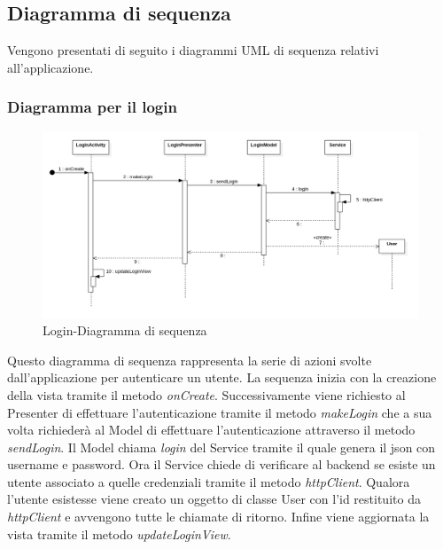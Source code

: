\subsection{Diagramma di sequenza}
Vengono presentati di seguito i diagrammi UML di sequenza relativi all'applicazione.

\subsubsection{Diagramma per il login}
\begin{figure}[H]
	\centering
	\includegraphics[width=16cm]{res/images/loginSeq.png}
	\caption{Login-Diagramma di sequenza}
	\label{fig:Login-Diagramma di sequenza}
\end{figure}
Questo diagramma di sequenza rappresenta la serie di azioni svolte dall'applicazione per autenticare un utente.
La sequenza inizia con la creazione della vista tramite il metodo \textit{onCreate}. Successivamente viene richiesto al Presenter di effettuare l'autenticazione tramite il metodo \textit{makeLogin} che a sua volta richiederà al Model di effettuare l'autenticazione attraverso il metodo \textit{sendLogin}.
Il Model chiama \textit{login} del Service tramite il quale genera il json con username e password. Ora il Service chiede di verificare al backend se esiste un utente associato a quelle credenziali tramite il metodo \textit{httpClient}.
Qualora l'utente esistesse viene creato un oggetto di classe User con l'id restituito da \textit{httpClient} e avvengono tutte le chiamate di ritorno.
Infine viene aggiornata la vista tramite il metodo \textit{updateLoginView}. 

